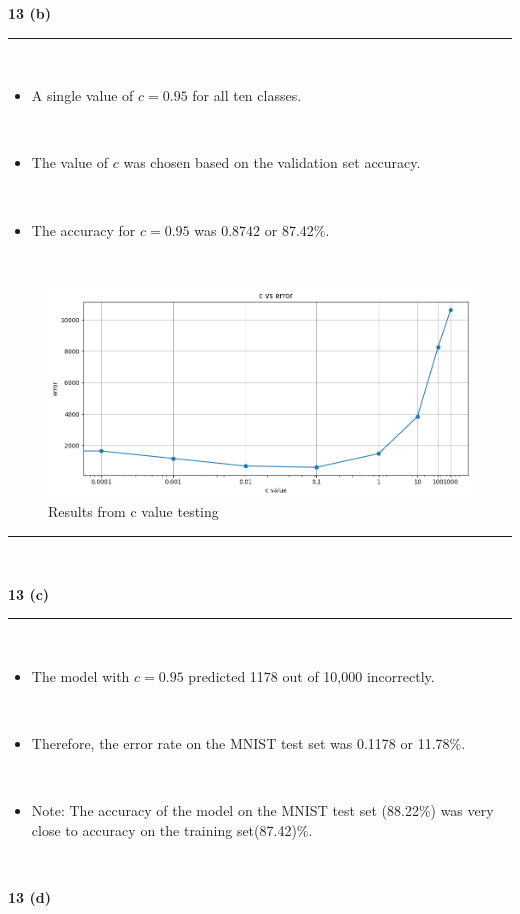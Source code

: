 \documentclass{article}
\begin{document}
\newpage
\parbox{\textwidth}{\textbf{13 (b)}}
\noindent\rule{\textwidth}{0.4pt}\\
\begin{itemize}
    \item \parbox{\textwidth}{A single value of $c=0.95$ for all ten classes.}\\
    \item \parbox{\textwidth}{The value of $c$ was chosen based on the validation set accuracy.}\\
    \item \parbox{\textwidth}{The accuracy for $c=0.95$ was $0.8742$ or 87.42\%.}\\
\end{itemize}

\begin{figure}[H]
\includegraphics[width=1\textwidth]{hw3_13_b.png} 
\caption{Results from c value testing}
\end{figure}
\noindent\rule{\textwidth}{0.4pt}\\
\newpage
\parbox{\textwidth}{\textbf{13 (c)}}
\noindent\rule{\textwidth}{0.4pt}\\
\begin{itemize}
    \item \parbox{\textwidth}{The model with $c=0.95$ predicted 1178 out of 10,000 incorrectly.}\\
    \item \parbox{\textwidth}{Therefore, the error rate on the MNIST test set was 0.1178 or 11.78\%.}\\
    \item \parbox{\textwidth}{Note: The accuracy of the model on the MNIST test set (88.22\%) was very close to accuracy on the training set(87.42)\%.}\\
\end{itemize}

\newpage
\parbox{\textwidth}{\textbf{13 (d)}}
\end{document}
